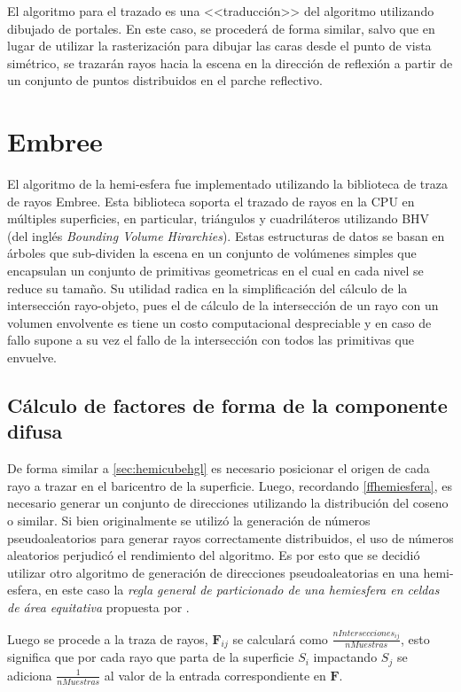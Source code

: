 El algoritmo para el trazado es una <<traducción>> del algoritmo utilizando dibujado de portales. En este caso, se procederá de forma similar, salvo que en lugar de utilizar la rasterización para dibujar las caras desde el punto de vista simétrico, se trazarán rayos hacia la escena en la dirección de reflexión a partir de un conjunto de puntos distribuidos en el parche reflectivo.

\section{Embree}
\label{sec:embree-impl}

El algoritmo de la hemi-esfera fue implementado utilizando la biblioteca de traza de rayos Embree. Esta biblioteca soporta el trazado de rayos en la CPU en múltiples superficies, en particular, triángulos y cuadriláteros utilizando BHV (del inglés \textit{Bounding Volume Hirarchies}). Estas estructuras de datos se basan en árboles que sub-dividen la escena en un conjunto de volúmenes simples que encapsulan un conjunto de primitivas geometricas en el cual en cada nivel se reduce su tamaño. Su utilidad radica en la simplificación del cálculo de la intersección rayo-objeto, pues el de cálculo de la intersección de un rayo con un volumen envolvente es tiene un costo computacional despreciable y en caso de fallo supone a su vez el fallo de la intersección con todos las primitivas que envuelve.

\subsection{Cálculo de factores de forma de la componente difusa}

De forma similar a \ref{sec:hemicubehgl} es necesario posicionar el origen de cada rayo a trazar en el baricentro de la superficie. Luego, recordando \eqref{ffhemiesfera}, es necesario generar un conjunto de direcciones utilizando la distribución del coseno o similar. Si bien originalmente se utilizó la generación de números pseudoaleatorios para generar rayos correctamente distribuidos, el uso de números aleatorios perjudicó el rendimiento del algoritmo. Es por esto que se decidió utilizar otro algoritmo de generación de direcciones pseudoaleatorias en una hemi-esfera, en este caso la \textit{regla general de particionado de una hemiesfera en celdas de área equitativa} propuesta por \citeauthor{Becker}.


Luego se procede a la traza de rayos, $\mathbf{F}_{ij}$ se calculará como $\frac{nIntersecciones_{ij}}{nMuestras}$, esto significa que por cada rayo que parta de la superficie $S_{i}$ impactando $S_{j}$ se adiciona $\frac{1}{nMuestras}$ al valor de la entrada correspondiente en $\mathbf{F}$.


